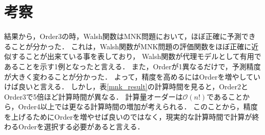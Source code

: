 \documentclass[main]{subfiles}
\begin{document}
        \section{考察}
        結果から，Order3の時，Walsh関数はMNK問題において，ほぼ正確に予測できることが分かった．
        これは，Walsh関数がMNK問題の評価関数をほぼ正確に近似することが出来ている事を表しており，
        Walsh関数が代理モデルとして有用であることを示す1例となったと言える．
        また，Orderが1異なるだけで，予測精度が大きく変わることが分かった．
        よって，精度を高めるにはOrderを増やしていけば良いと言える．
        しかし，表\ref{mnk_result}の計算時間を見ると，Order2とOrder3で5倍ほど計算時間が異なる．
        計算量オーダーは$\mathcal{O}(n!)$であることから，Order4以上では更なる計算時間の増加が考えられる．
        このことから，精度を上げるためにOrderを増やせば良いのではなく，現実的な計算時間で計算が終わるOrderを選択する必要があると言える．
  
\end{document}

